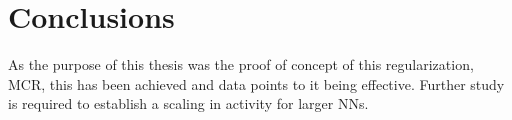 \chapter{Conclusions}

As the purpose of this thesis was the proof of concept of this regularization, MCR, this has been achieved and data points to it being effective. Further study is required to establish a scaling in activity for larger NNs. 